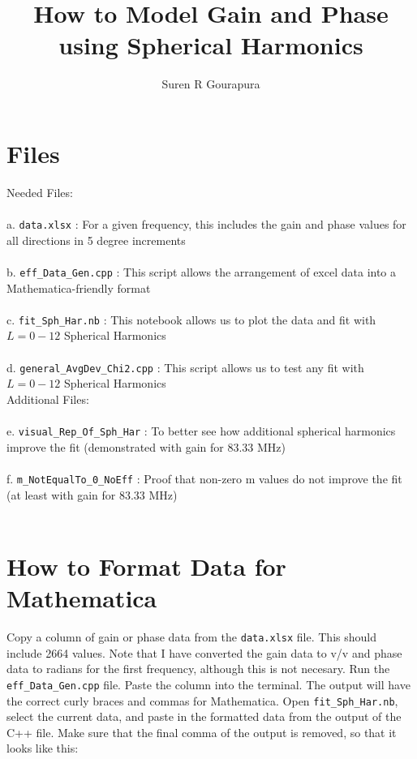 \documentclass[11pt]{article} %
\title{How to Model Gain and Phase using Spherical Harmonics}
\author{Suren R Gourapura}
\begin{document}
\maketitle


\section{Files}

Needed Files: \\ \\
a. \texttt{data.xlsx} : For a given frequency, this includes the gain and phase values for all directions in 5 degree increments\\ \\
b. \texttt{eff\_Data\_Gen.cpp} :  This script allows the arrangement of excel data into a Mathematica-friendly format\\ \\
c. \texttt{fit\_Sph\_Har.nb} : This notebook allows us to plot the data and fit with $L = 0-12$ Spherical Harmonics\\ \\
d. \texttt{general\_AvgDev\_Chi2.cpp} : This script allows us to test any fit with $L = 0-12$ Spherical Harmonics\\ 

\noindent Additional Files:\\ \\
e. \texttt{visual\_Rep\_Of\_Sph\_Har} : To better see how additional spherical harmonics improve the fit (demonstrated with gain for 83.33 MHz)\\ \\
f. \texttt{m\_NotEqualTo\_0\_NoEff} : Proof that non-zero m values do not improve the fit (at least with gain for 83.33 MHz)\\ \\


\section{How to Format Data for Mathematica}

Copy a column of gain or phase data from the \texttt{data.xlsx} file. This should include 2664 values.  Note that I have converted the gain data to v/v and phase data to radians for the first frequency, although this is not necesary. Run the \texttt{eff\_Data\_Gen.cpp} file. Paste the column into the terminal. The output will have the correct curly braces and commas for Mathematica. Open \texttt{fit\_Sph\_Har.nb}, select the current data, and paste in the formatted data from the output of the C++ file. Make sure that the final comma of the output is removed, so that it looks like this: \\
\end{document}
